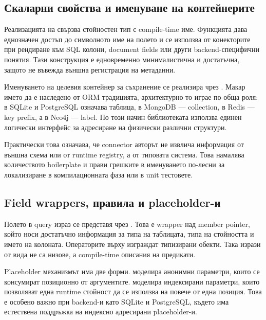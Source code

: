 \subsection{Скаларни свойства и именуване на контейнерите}

Реализацията на  свързва стойностен тип с compile-time име. Функцията  дава еднозначен достъп до символното име на полето и се използва от конекторите при рендиране към SQL колони, document fields или други backend-специфични понятия. Тази конструкция е едновременно минималистична и достатъчна, защото не въвежда външна регистрация на метаданни.

Именуването на целевия контейнер за съхранение се реализира чрез . Макар името да е наследено от ORM традицията, архитектурно то играе по-обща роля: в SQLite и PostgreSQL означава таблица, в MongoDB --- collection, в Redis --- key prefix, а в Neo4j --- label. По този начин библиотеката използва единен логически интерфейс за адресиране на физически различни структури.

Практически това означава, че connector авторът не извлича информация от външна схема или от runtime registry, а от типовата система. Това намалява количеството boilerplate и прави грешките в именуването по-лесни за локализиране в компилационната фаза или в unit тестовете.

\subsection{Field wrappers, правила и placeholder-и}

Полето в query израз се представя чрез . Това е  wrapper над member pointer, който носи достатъчно информация за типа на таблицата, типа на стойността и името на колоната. Операторите върху  изграждат типизирани  обекти. Така изрази от вида  не са низове, а compile-time описания на предикати.

Placeholder механизмът има две форми.  моделира анонимни параметри, които се консумират позиционно от  аргументите.  моделира индексирани параметри, които позволяват една runtime стойност да се използва на повече от една позиция. Това е особено важно при backend-и като SQLite и PostgreSQL, където има естествена поддръжка на индексно адресирани placeholder-и.

